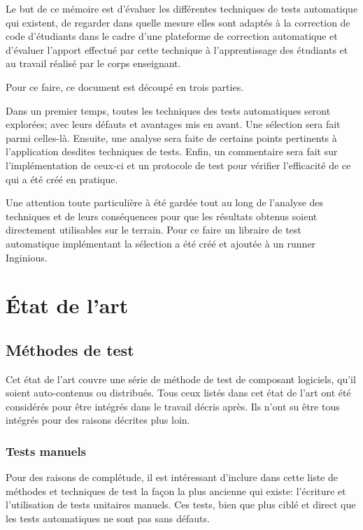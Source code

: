 \documentclass[a4paper]{report}
\begin{document}
Le but de ce mémoire est d'évaluer les différentes techniques de tests automatique qui existent, de regarder dans quelle mesure elles sont adaptés à la correction de code d'étudiants dans le cadre d'une plateforme de correction automatique et d'évaluer l'apport effectué par cette technique à l'apprentissage des étudiants et au travail réalisé par le corps enseignant.

Pour ce faire, ce document est découpé en trois parties.

Dans un premier temps, toutes les techniques des tests automatiques seront explorées; avec leurs défauts et avantages mis en avant.
Une sélection sera fait parmi celles-là.
Ensuite, une analyse sera faite de certains points pertinents à l'application desdites techniques de tests.
Enfin, un commentaire sera fait sur l'implémentation de ceux-ci et un protocole de test pour vérifier l'efficacité de ce qui a été créé en pratique.

Une attention toute particulière à été gardée tout au long de l'analyse des techniques et de leurs conséquences pour que les résultats obtenus soient directement utilisables sur le terrain.
Pour ce faire un libraire de test automatique implémentant la sélection a été créé et ajoutée à un runner Inginious.


\chapter{État de l'art}


\section{Méthodes de test}
Cet état de l'art couvre une série de méthode de test de composant logiciels, qu'il soient auto-contenus ou distribués.
Tous ceux listés dans cet état de l'art ont été considérés pour être intégrés dans le travail décris après.
Ils n'ont su être tous intégrés pour des raisons décrites plus loin.


\subsection{Tests manuels}

Pour des raisons de complétude, il est intéressant d’inclure dans cette liste de méthodes et techniques de test la façon la plus ancienne qui existe: l’écriture et l’utilisation de tests unitaires manuels.
Ces tests, bien que plus ciblé et direct que les tests automatiques ne sont pas sans défauts.
\end{document}

